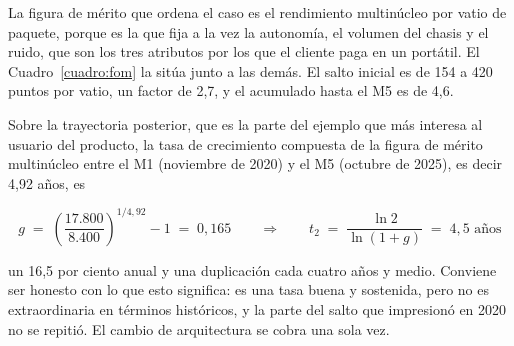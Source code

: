 \documentclass[11pt,letterpaper]{article}
\begin{document}
La figura de mérito que ordena el caso es el rendimiento multinúcleo por vatio
de paquete, porque es la que fija a la vez la autonomía, el volumen del chasis
y el ruido, que son los tres atributos por los que el cliente paga en un
portátil. El Cuadro~\ref{cuadro:fom} la sitúa junto a las demás. El salto
inicial es de 154 a 420 puntos por vatio, un factor de 2,7, y el acumulado
hasta el M5 es de 4,6.

Sobre la trayectoria posterior, que es la parte del ejemplo que más interesa
al usuario del producto, la tasa de crecimiento compuesta de la figura de
mérito multinúcleo entre el M1 (noviembre de 2020) y el M5 (octubre de 2025),
es decir 4,92 años, es

\begin{equation}
g \;=\; \left(\frac{17.800}{8.400}\right)^{1/4,92} - 1 \;=\; 0{,}165
\qquad\Longrightarrow\qquad
t_{2} \;=\; \frac{\ln 2}{\ln(1+g)} \;=\; 4{,}5 \text{ años}
\label{eq:cagr}
\end{equation}

un 16,5 por ciento anual y una duplicación cada cuatro años y medio. Conviene
ser honesto con lo que esto significa: es una tasa buena y sostenida, pero no
es extraordinaria en términos históricos, y la parte del salto que impresionó
en 2020 no se repitió. El cambio de arquitectura se cobra una sola vez.
\end{document}
